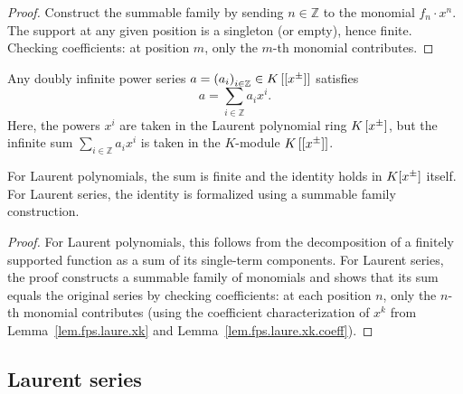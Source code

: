 \begin{proof}
\leanok
Construct the summable family by sending $n \in \mathbb{Z}$ to
the monomial $f_n \cdot x^n$.
The support at any given position is a singleton (or empty), hence finite.
Checking coefficients: at position $m$, only the $m$-th monomial contributes.
\end{proof}

\begin{proposition}
\label{prop.fps.laure.a=sumaixi}
\leantarget
\leanok
Any doubly infinite power series $a=\left(
a_{i}\right)  _{i\in\mathbb{Z}}\in K\left[  \left[  x^{\pm}\right]  \right]  $
satisfies%
\[
a=\sum_{i\in\mathbb{Z}}a_{i}x^{i}.
\]
Here, the powers $x^{i}$ are taken in the Laurent polynomial ring $K\left[
x^{\pm}\right]  $, but the infinite sum $\sum_{i\in\mathbb{Z}}a_{i}x^{i}$ is
taken in the $K$-module $K\left[  \left[  x^{\pm}\right]  \right]  $.

For Laurent polynomials, the sum is finite and the identity holds in
$K[x^{\pm}]$ itself.
For Laurent series, the identity is formalized using a summable family construction.
\end{proposition}

\begin{proof}
For Laurent polynomials, this follows from the decomposition of
a finitely supported function as a sum of its single-term components.
For Laurent series, the proof constructs a summable family of
monomials and shows that its sum equals the original
series by checking coefficients: at each position $n$, only the $n$-th
monomial contributes (using the coefficient characterization of $x^k$
from Lemma~\ref{lem.fps.laure.xk} and Lemma~\ref{lem.fps.laure.xk.coeff}).
\end{proof}

\subsection{Laurent series}

